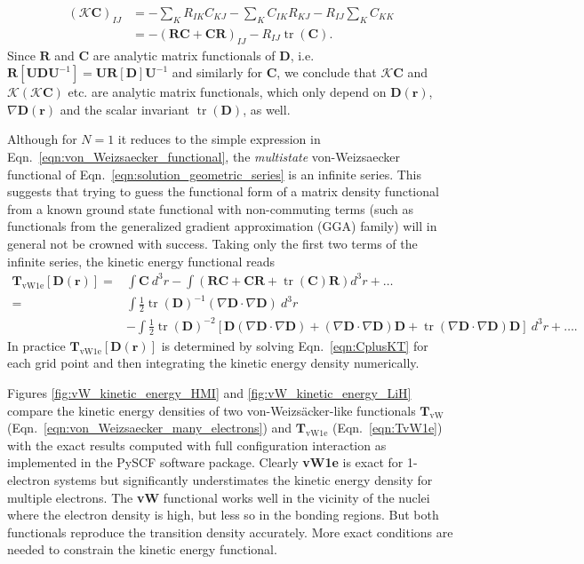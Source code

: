 \documentclass[journal=jpca,manuscript=article,layout=singlecolumn]{achemso}
\DeclareMathOperator{\tr}{tr}
\newcommand\m[1]{\mathbf{#1}}
\renewcommand\vec[1]{\mathbf{#1}}
\begin{document}
\begin{equation}
\begin{split}
  (\mathcal{K} \vec{C})_{IJ} &= -\sum_{K} R_{IK} C_{KJ} - \sum_{K} C_{IK} R_{KJ} - R_{IJ} \sum_K C_{KK} \\
   &= - (\m{R} \m{C} + \m{C} \m{R})_{IJ} - R_{IJ} \tr(\m{C}).
\end{split}
\end{equation}
Since $\m{R}$ and $\m{C}$ are analytic matrix functionals of $\m{D}$, i.e. $\m{R}[\m{U} \m{D} \m{U}^{-1}] = \m{U} \m{R}[\m{D}] \m{U}^{-1}$ and similarly for $\m{C}$,
we conclude that $\mathcal{K} \vec{C}$ and $\mathcal{K} (\mathcal{K} \vec{C})$ etc. are analytic matrix functionals, which only depend on $\m{D}(\vec{r})$, $\nabla \m{D}(\vec{r})$ and the scalar invariant $\tr(\m{D})$, as well.

Although for $N=1$ it reduces to the simple expression in Eqn.~\ref{eqn:von_Weizsaecker_functional},
the \emph{multistate} von-Weizsaecker functional of Eqn.~\ref{eqn:solution_geometric_series} is an infinite series. 
This suggests that trying to guess the functional form of a matrix density functional from a known ground state functional
with non-commuting terms (such as functionals from the generalized gradient approximation (GGA) family)
will in general not be crowned with success.
Taking only the first two terms of the infinite series, the kinetic energy functional reads
\begin{equation}
\begin{split}
  \m{T}_{\text{vW1e}}[\m{D}(\vec{r})] =& \int \m{C} ~ d^3\!r  - \int \left(\m{R} \m{C} + \m{C} \m{R} + \tr(\m{C}) \m{R} \right) d^3\!r  + \ldots \\
  =& \int \frac{1}{2} \tr(\m{D})^{-1} (\nabla \m{D} \cdot \nabla \m{D}) ~ d^3\!r \\
  & - \int \frac{1}{2} \tr(\m{D})^{-2} \left[ \m{D} (\nabla \m{D} \cdot \nabla \m{D}) + (\nabla \m{D} \cdot \nabla \m{D}) \m{D} + \tr(\nabla \m{D} \cdot \nabla \m{D}) \m{D} \right] ~ d^3\!r + \ldots .
\end{split}
\label{eqn:TvW1e}
\end{equation}
In practice $\m{T}_{\text{vW1e}}[\m{D}(\vec{r})]$ is determined by solving Eqn.~\ref{eqn:CplusKT} for
each grid point and then integrating the kinetic energy density numerically.

Figures \ref{fig:vW_kinetic_energy_HMI} and \ref{fig:vW_kinetic_energy_LiH} compare the kinetic energy densities
of two von-Weizs\"{a}cker-like functionals $\m{T}_{\text{vW}}$ (Eqn.~\ref{eqn:von_Weizsaecker_many_electrons})
and $\m{T}_{\text{vW1e}}$ (Eqn.~\ref{eqn:TvW1e}) with the exact results
computed with full configuration interaction as implemented in the PySCF \cite{Sun2020} software package. Clearly \textbf{vW1e} is exact for 1-electron systems
but significantly understimates the kinetic energy density for multiple electrons.
The \textbf{vW} functional works well in the vicinity of the nuclei where the electron density is high, but less so in the bonding regions.
But both functionals reproduce the transition density accurately.
More exact conditions are needed to constrain the kinetic energy functional.
\end{document}

